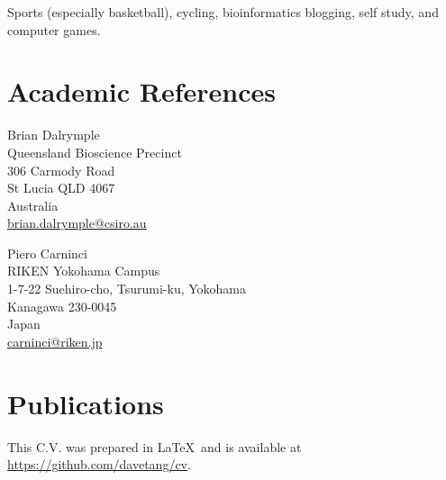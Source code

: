 \documentclass[a4paper, 10pt]{article}
\begin{document}
Sports (especially basketball), cycling, bioinformatics blogging, self study, and computer games.

\section*{Academic References}

\begin{minipage}[ht]{.50\textwidth}
Brian Dalrymple \\
Queensland Bioscience Precinct \\
306 Carmody Road \\
St Lucia QLD 4067 \\
Australia \\
\href{mailto:brian.dalrymple@csiro.au}{brian.dalrymple@csiro.au}
\end{minipage}
\begin{minipage}[ht]{.50\textwidth}
Piero Carninci \\
RIKEN Yokohama Campus \\
1-7-22 Suehiro-cho, Tsurumi-ku, Yokohama \\
Kanagawa 230-0045 \\
Japan \\
\href{mailto:carninci@riken.jp}{carninci@riken.jp}
\end{minipage}

\section*{Publications}
\begingroup
   \renewcommand{\section}[2]{}%
   
   \nocite{*}
   
\endgroup

\vfill

\footnotesize
This C.V. was prepared in \LaTeX\ and is available at \href{https://github.com/davetang/cv}{https://github.com/davetang/cv}.
\end{document}
